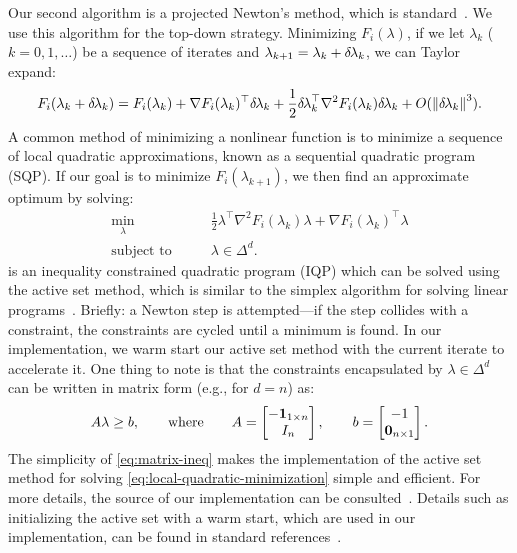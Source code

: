 \documentclass[eikonal.tex]{subfiles}
\begin{document}
Our second algorithm is a projected Newton's method, which is
standard~\cite{bertsekas1999nonlinear,nocedal2006numerical}. We use
this algorithm for the top-down strategy. Minimizing $F_i(\lambda)$,
if we let $\lambda_k$ ($k = 0, 1, \hdots$) be a sequence of iterates
and $\lambda_{k+1} = \lambda_k + {\delta \hspace{-0.1em} \lambda}_k$, we can Taylor
expand:
\begin{equation}
  F_i(\lambda_k + {\delta \hspace{-0.1em} \lambda}_k) = F_i(\lambda_k) + \nabla F_i(\lambda_k)^\top {\delta \hspace{-0.1em} \lambda}_k + \frac{1}{2} {\delta \hspace{-0.1em} \lambda}_k^\top \nabla^2 F_i(\lambda_k) {\delta \hspace{-0.1em} \lambda}_k + O(\left\|{\delta \hspace{-0.1em} \lambda}_k\right\|^3).
\end{equation}
A common method of minimizing a nonlinear function is to minimize a
sequence of local quadratic approximations, known as a sequential
quadratic program (SQP). If our goal is to minimize
$F_i(\lambda_{k+1})$, we then find an approximate optimum by solving:
\begin{equation}\label{eq:local-quadratic-minimization}
  \begin{split}
    \min_{\lambda} &\qquad \frac{1}{2} \lambda^\top \nabla^2 F_i(\lambda_k) \lambda + \nabla F_i(\lambda_k)^\top \lambda \\
    \text{subject to} &\qquad \lambda \in \Delta^d.
  \end{split}
\end{equation}
 is an inequality constrained
quadratic program (IQP) which can be solved using the active set
method, which is similar to the simplex algorithm for solving linear
programs~\cite{nocedal2006numerical}. Briefly: a Newton step is
attempted---if the step collides with a constraint, the constraints
are cycled until a minimum is found. In our implementation, we warm
start our active set method with the current iterate to accelerate
it. One thing to note is that the constraints encapsulated by
$\lambda \in \Delta^d$ can be written in matrix form (e.g., for
$d = n$) as:
\begin{equation}
  \label{eq:matrix-ineq}
  A \lambda \geq b, \qquad \text{where} \qquad A = \begin{bmatrix}
    -\m{1}_{1 \times n} \\ I_n
  \end{bmatrix}, \qquad b = \begin{bmatrix} -1 \\ \m{0}_{n \times 1} \end{bmatrix}.
\end{equation}
The simplicity of \cref{eq:matrix-ineq} makes the implementation of
the active set method for solving
\cref{eq:local-quadratic-minimization} simple and efficient. For more
details, the source of our implementation can be
consulted~\cite{sfp-umiacs-homepage}. Details such as initializing the
active set with a warm start, which are used in our implementation,
can be found in standard references~\cite{nocedal2006numerical}.
\end{document}
